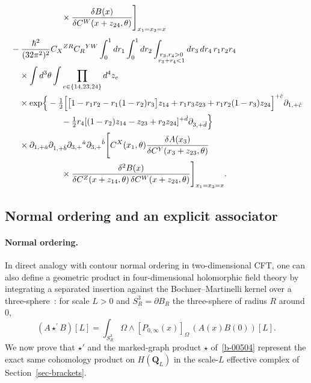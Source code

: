 \documentclass[11pt]{article}
\numberwithin{equation}{section}
\numberwithin{figure}{section}
\numberwithin{table}{section}
\begin{document}
\begin{align}
&\hspace{60pt}\times\frac{\delta B(x)}{\delta C^W(x+z_{24},\theta)}
\Bigg]_{x_1=x_3=x}\notag\\[4pt]
&-\frac{\hbar^2}{(32\pi^2)^2}C_X{}^{ZR}C_R{}^{YW}
\int_0^1dr_1\int_0^1dr_2
\int_{\substack{r_3,r_4>0\\r_3+r_4<1}}dr_3\,dr_4\,r_1r_2r_4\notag\\*
&\quad\times\int d^3\theta\int\prod_{e\in\{14,23,24\}}d^4z_e\notag\\*
&\quad\times\exp\!\Big\{-\tfrac12\Big[
\big[1-r_1r_2-r_1(1-r_2)r_3\big]z_{14}
+r_1r_3z_{23}+r_1r_2(1-r_3)z_{24}\Big]^{+\dot c}\partial_{1,+\dot c}\notag\\*
&\hspace{60pt}-\tfrac12r_4[(1-r_2)z_{14}-z_{23}+r_2z_{24}]^{+\dot d}\partial_{3,+\dot d}\Big\}\notag\\*
&\quad\times\partial_{1,+\dot a}\partial_{1,+\dot b}
\partial_{3,+}{}^{\dot a}\partial_{3,+}{}^{\dot b}
\Bigg[C^X(x_1,\theta)
\frac{\delta A(x_3)}{\delta C^Y(x_3+z_{23},\theta)}\notag\\*
&\hspace{60pt}\times\frac{\delta^2 B(x)}{\delta C^Z(x+z_{14},\theta)\,\delta C^W(x+z_{24},\theta)}
\Bigg]_{x_1=x_3=x}.
\label{eq-product2A}
\end{align}

\subsection{Normal ordering and an explicit associator}\label{sec-normal-ordering}

\paragraph{Normal ordering.}\label{quantum-normal-ordering}

In direct analogy with contour normal ordering in two-dimensional CFT, one can also define a geometric product in four-dimensional holomorphic field theory by integrating a separated insertion against the Bochner--Martinelli kernel over a three-sphere~\cite[Section 2.3]{semichiral}: for scale $L>0$ and $S_R^3=\partial B_R$ the three-sphere of radius $R$ around $0$,
\begin{equation}\label{eq-contour-product-definition}
(A\star^{\prime}B)[L]=\int_{S_R^3}\Omega\wedge[P_{0,\infty}(x)]_\Omega\,(A(x)B(0))[L].
\end{equation}
We now prove that $\star'$ and the marked-graph product $\star$ of~\eqref{b-00504} represent the exact same cohomology product on $H(\mathbf Q_L)$ in the scale-$L$ effective complex of Section~\ref{sec-brackets}.
\end{document}
